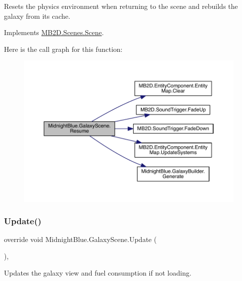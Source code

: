 Resets the physics environment when returning to the scene and rebuilds the galaxy from its cache. 



Implements \hyperlink{class_m_b2_d_1_1_scenes_1_1_scene_ad13639db22b059a1b714eefd9d927735}{M\+B2\+D.\+Scenes.\+Scene}.

Here is the call graph for this function\+:
\nopagebreak
\begin{figure}[H]
\begin{center}
\leavevmode
\includegraphics[width=350pt]{class_midnight_blue_1_1_galaxy_scene_ab641e6727cdb64dc6487e9a229521692_cgraph}
\end{center}
\end{figure}
\hypertarget{class_midnight_blue_1_1_galaxy_scene_a9dfa66406143ed20f4d534c768f05a78}{}\label{class_midnight_blue_1_1_galaxy_scene_a9dfa66406143ed20f4d534c768f05a78} 
\subsubsection{\texorpdfstring{Update()}{Update()}}
{\footnotesize\ttfamily override void Midnight\+Blue.\+Galaxy\+Scene.\+Update (\begin{DoxyParamCaption}{ }\end{DoxyParamCaption})\hspace{0.3cm}{\ttfamily [inline]}, {\ttfamily [virtual]}}



Updates the galaxy view and fuel consumption if not loading. 



